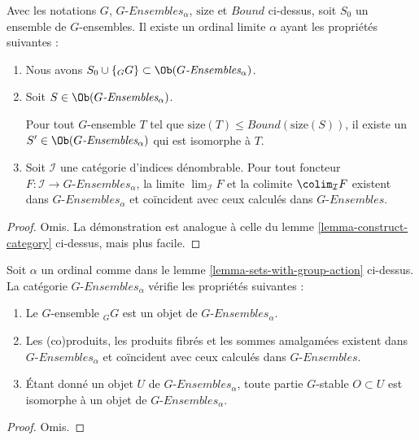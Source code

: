 \begin{lemma}
\label{lemma-sets-with-group-action}
Avec les notations $G$, $G\textit{-Ensembles}_\alpha$, $\text{size}$ et $Bound$
ci-dessus, soit $S_0$ un ensemble de $G$-ensembles.
Il existe un ordinal limite $\alpha$ ayant les propriétés suivantes :
\begin{enumerate}
\item Nous avons $S_0 \cup \{{}_GG\} \subset \Ob(G\textit{-Ensembles}_\alpha)$.
\item Soit $S \in \Ob(G\textit{-Ensembles}_\alpha)$.\par\noindent
Pour tout $G$-ensemble $T$ tel
que $\text{size}(T) \leq Bound(\text{size}(S))$, il existe un
$S' \in \Ob(G\textit{-Ensembles}_\alpha)$ qui est isomorphe à $T$.
\item Soit $\mathcal{I}$ une catégorie d'indices dénombrable. Pour tout foncteur
$F : \mathcal{I} \to G\textit{-Ensembles}_\alpha$, la limite
$\lim_\mathcal{I} F$ et la colimite $\colim_\mathcal{I} F$ existent dans
$G\textit{-Ensembles}_\alpha$ et coïncident avec ceux calculés dans $G\textit{-Ensembles}$.
\end{enumerate}
\end{lemma}

\begin{proof}
Omis. La démonstration est analogue à celle du
lemme \ref{lemma-construct-category} ci-dessus, mais plus facile.
\end{proof}

\begin{lemma}
\label{lemma-what-is-in-it-G-sets}
Soit $\alpha$ un ordinal comme dans le
lemme \ref{lemma-sets-with-group-action} ci-dessus. La catégorie
$G\textit{-Ensembles}_\alpha$ vérifie les propriétés suivantes :
\begin{enumerate}
\item Le $G$-ensemble ${}_GG$ est un objet de $G\textit{-Ensembles}_\alpha$.
\item Les (co)produits, les produits fibrés et les sommes amalgamées existent
dans $G\textit{-Ensembles}_\alpha$ et coïncident avec ceux calculés dans
$G\textit{-Ensembles}$.
\item Étant donné un objet $U$ de $G\textit{-Ensembles}_\alpha$, toute partie
$G$-stable $O \subset U$ est isomorphe à un objet de
$G\textit{-Ensembles}_\alpha$.
\end{enumerate}
\end{lemma}

\begin{proof}
Omis.
\end{proof}


